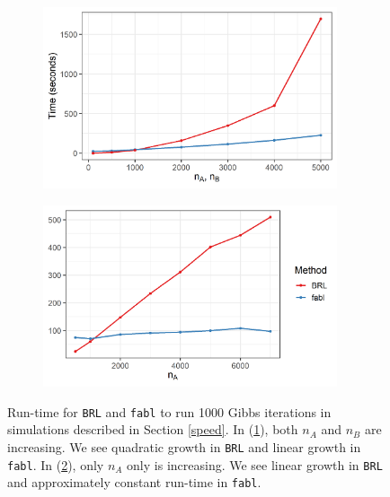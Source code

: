 \documentclass[ba]{imsart}
\begin{document}
{		\begin{figure}[t]
			\centering
			\begin{subfigure}{.5\textwidth}
				\centering
				\includegraphics[width=0.95\textwidth]{../notes/figures/sadinle_speed_plot_new}
				\caption{}
				\label{fig:speed1}
			\end{subfigure}%
			\begin{subfigure}{.5\textwidth}
				\centering
				\includegraphics[width=0.95\textwidth]{../notes/figures/speed_plot_fixed_nB_new} 
				\caption{}
				\label{fig:speed2}
			\end{subfigure}
			\caption{Run-time for \texttt{BRL} and \texttt{fabl} to run 1000 Gibbs iterations in simulations described in Section \ref{speed}. In (\ref{fig:speed1}), both $n_A$ and $n_B$ are increasing. We see quadratic growth in \texttt{BRL} and linear growth in \texttt{fabl}. In (\ref{fig:speed2}), only $n_A$ only is increasing. We see linear growth in \texttt{BRL} and approximately constant run-time in \texttt{fabl}.}
			\label{fig:speed_sims}
		\end{figure}
	}
	
\end{document}
